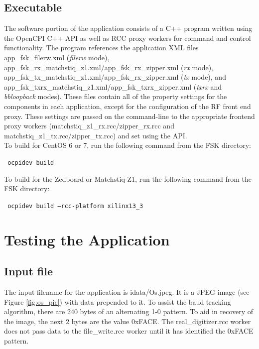 \subsection{Executable}
The software portion of the application consists of a C++ program written using the OpenCPI C++ API as well as RCC proxy workers for command and control functionality. The program references the application XML files app\_fsk\_filerw.xml (\textit{filerw} mode), app\_fsk\_rx\_matchstiq\_z1.xml/app\_fsk\_rx\_zipper.xml (\textit{rx} mode), app\_fsk\_tx\_matchstiq\_z1.xml/app\_fsk\_rx\_zipper.xml (\textit{tx} mode), and app\_fsk\_txrx\_matchstiq\_z1.xml/app\_fsk\_txrx\_zipper.xml (\textit{txrx} and \textit{bbloopback} modes). These files contain all of the property settings for the components in each application, except for the configuration of the RF front end proxy. These settings are passed on the command-line to the appropriate frontend proxy workers (matchstiq\_z1\_rx.rcc/zipper\_rx.rcc and matchstiq\_z1\_tx.rcc/zipper\_tx.rcc) and set using the API.\\
To build for CentOS 6 or 7, run the following command from the FSK directory:\par\medskip
\texttt{ ocpidev build}\par\medskip
\noindent To build for the Zedboard or Matchstiq-Z1, run the following command from the FSK directory:\par\medskip 
\texttt{ ocpidev build --rcc-platform xilinx13\_3 }\par\medskip

\section{Testing the Application}
\subsection{Input file}
The input filename for the application is idata/Os.jpeg. It is a JPEG image (see Figure \ref{fig:os_pic}) with data prepended to it. To assist the baud tracking algorithm, there are 240 bytes of an alternating 1-0 pattern. To aid in recovery of the image, the next 2 bytes are the value 0xFACE. The real\_digitizer.rcc worker does not pass data to the file\_write.rcc worker until it has identified the 0xFACE pattern.
